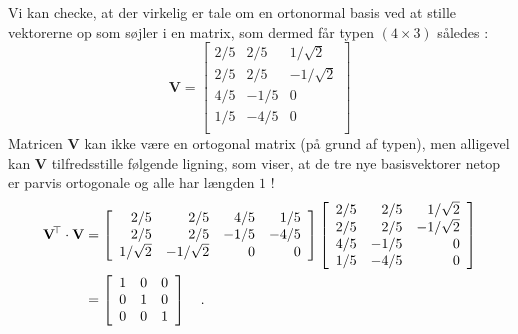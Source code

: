 \begin{example}
Vi kan checke, at der virkelig er tale om en ortonormal basis ved at stille vektorerne op som søjler i en matrix, som dermed får typen $(4 \times 3)$ således :
\begin{equation}
\mathbf{V} =  \left[
            \begin{array}{rrr}
             {2}/{5} & {2}/{5} & {1}/{\sqrt{2}} \\
              {2}/{5} & {2}/{5} & -{1}/{\sqrt{2}} \\
              {4}/{5} & -{1}/{5} & 0 \\
             {1}/{5} & -{4}/{5} & 0 \\
            \end{array}
          \right]
\end{equation}
Matricen $\mathbf{V}$ kan ikke være en ortogonal matrix (på grund af typen), men alligevel kan $\mathbf{V}$ tilfredsstille følgende ligning, som viser, at de tre nye basisvektorer netop er parvis ortogonale og alle har længden $1$ !
\begin{equation}
\begin{aligned}
\mathbf{V}\hspace*{-.6mm}^{\top} \cdot \mathbf{V} &=  \left[
                          \begin{array}{rrrr}
                            2/5 & 2/5 & 4/5 & 1/5 \\
                            2/5 & 2/5 & -1/5 & -4/5 \\
                            1/\sqrt{2} & -1/\sqrt{2} & 0 & 0 \\
                          \end{array}
                        \right]
            \left[
            \begin{array}{rrr}
             {2}/{5} & {2}/{5} & {1}/{\sqrt{2}} \\
              {2}/{5} & {2}/{5} & -{1}/{\sqrt{2}} \\
              {4}/{5} & -{1}/{5} & 0 \\
             {1}/{5} & -{4}/{5} & 0 \\
            \end{array}
          \right] \\
&= \left[
                      \begin{array}{rrr}
                        1 & 0 & 0 \\
                        0 & 1 & 0 \\
                        0 & 0 & 1 \\
                      \end{array}
                    \right] \quad .
\end{aligned}
\end{equation}

\end{example}


